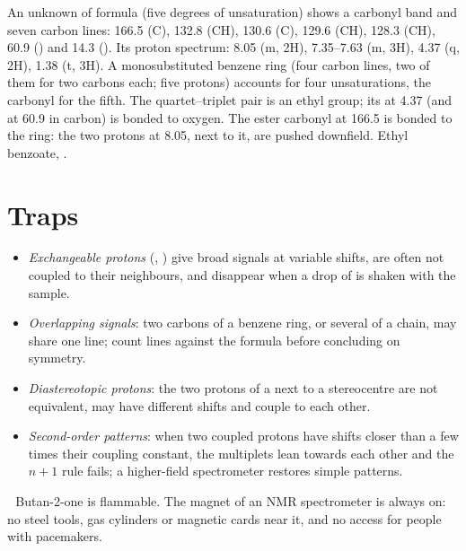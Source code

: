 \begin{example}\label{ex:b2:structure-determination:ester}
An unknown of formula  (five degrees of unsaturation) shows a carbonyl band and seven
carbon lines: 166.5 (C), 132.8 (CH), 130.6 (C), 129.6 (CH), 128.3 (CH), 60.9 () and 14.3
(). Its proton spectrum: 8.05 (m, 2H), 7.35--7.63 (m, 3H), 4.37 (q, 2H), 1.38 (t, 3H). A
monosubstituted benzene ring (four  carbon lines, two of them for two carbons each; five
 protons) accounts for four unsaturations, the carbonyl for the fifth. The quartet--triplet pair
is an ethyl group; its  at 4.37 (and at 60.9 in carbon) is bonded to oxygen. The ester carbonyl
at 166.5 is bonded to the ring: the two protons at 8.05, next to it, are pushed downfield. Ethyl
benzoate, .
\end{example}

\section{Traps}

\begin{itemize}
  \item \emph{Exchangeable protons} (, ) give broad signals at variable shifts, are
        often not coupled to their neighbours, and disappear when a drop of  is shaken with the
        sample.
  \item \emph{Overlapping signals}: two carbons of a benzene ring, or several  of a chain, may
        share one line; count lines against the formula before concluding on symmetry.
  \item \emph{Diastereotopic protons}: the two protons of a  next to a stereocentre are not
        equivalent, may have different shifts and couple to each other.
  \item \emph{Second-order patterns}: when two coupled protons have shifts closer than a few times their
        coupling constant, the multiplets lean towards each other and the $n+1$ rule fails; a
        higher-field spectrometer restores simple patterns.
\end{itemize}

\begin{safety}{\,\,}
Butan-2-one is flammable. The magnet of an NMR spectrometer is always on: no steel tools, gas
cylinders or magnetic cards near it, and no access for people with pacemakers.
\end{safety}

